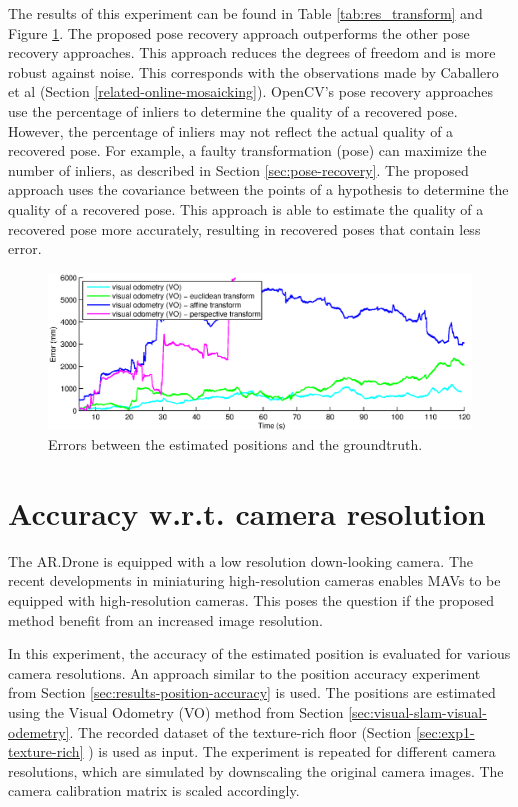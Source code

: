 The results of this experiment can be found in Table \ref{tab:res_transform} and Figure \ref{fig:exp4-transform-error}.
The proposed pose recovery approach outperforms the other pose recovery approaches.
This approach reduces the degrees of freedom and is more robust against noise.
This corresponds with the observations made by Caballero et al (Section \ref{related-online-mosaicking}).
OpenCV's pose recovery approaches use the percentage of inliers to determine the quality of a recovered pose.
However, the percentage of inliers may not reflect the actual quality of a recovered pose.
For example, a faulty transformation (pose) can maximize the number of inliers, as described in Section \ref{sec:pose-recovery}.
The proposed approach uses the covariance between the points of a hypothesis to determine the quality of a recovered pose.
This approach is able to estimate the quality of a recovered pose more accurately, resulting in recovered poses that contain less error.


\begin{figure}[htb!]
\centering
\includegraphics[width=\linewidth]{images/exp4-transform-error.eps}
\caption{Errors between the estimated positions and the groundtruth.}
\label{fig:exp4-transform-error}
\end{figure}



\clearpage
\section{Accuracy w.r.t. camera resolution}
\label{sec:res-cam-resolution}
The AR.Drone is equipped with a low resolution down-looking camera.
The recent developments in miniaturing high-resolution cameras enables MAVs to be equipped with high-resolution cameras.
This poses the question if the proposed method benefit from an increased image resolution.

In this experiment, the accuracy of the estimated position is evaluated for various camera resolutions.
An approach similar to the position accuracy experiment from Section \ref{sec:results-position-accuracy} is used.
The positions are estimated using the Visual Odometry (VO) method from Section \ref{sec:visual-slam-visual-odemetry}.
The recorded dataset of the texture-rich floor (Section \ref{sec:exp1-texture-rich} ) is used as input.
The experiment is repeated for different camera resolutions, which are simulated by downscaling the original camera images.
The camera calibration matrix is scaled accordingly.

